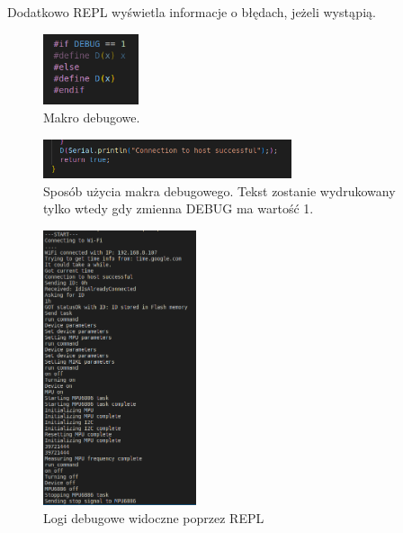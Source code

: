 \documentclass[12pt,oneside,a4paper]{book}
\theoremstyle{break}
\begin{document}
Dodatkowo REPL wyświetla informacje o błędach, jeżeli wystąpią.

\begin{figure}[H]
    \begin{center}
        \includegraphics[width=0.25\textwidth]{makro-cpp}
        \caption{Makro debugowe.}
        \label{rys:uc-makro-cpp}
    \end{center}
\end{figure}

\begin{figure}[H]
    \begin{center}
        \includegraphics[width=0.65\textwidth]{makro-cpp-use}
        \caption{Sposób użycia makra debugowego. Tekst zostanie wydrukowany tylko wtedy gdy zmienna DEBUG ma wartość 1.}
        \label{rys:uc-makro-cpp-use}
    \end{center}
\end{figure}

\begin{figure}[H]
    \begin{center}
        \includegraphics[width=0.4\textwidth]{uc-repl}
        \caption{Logi debugowe widoczne poprzez REPL}
        \label{rys:uc-repl}
    \end{center}
\end{figure}
\end{document}
